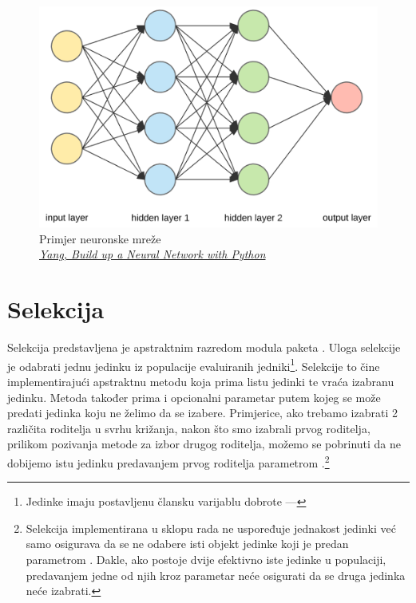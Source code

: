 \documentclass[times, utf8, zavrsni, numeric]{fer}
\begin{document}
\begin{figure}[h] 
    \centering
    \includegraphics[width=14cm]{img/nn}
    \caption{Primjer neuronske mreže\\ \textsl{\scriptsize
    \href{https://towardsdatascience.com/build-up-a-neural-network-with-python-7faea4561b31}{Yang,
    Build up a Neural Network with Python}}}\label{fig:nn}
\end{figure}


\section{Selekcija}

Selekcija  predstavljena je apstraktnim razredom
 modula  paketa . Uloga
selekcije je odabrati jednu jedinku iz populacije evaluiranih
jedniki\footnote{Jedinke imaju postavljenu člansku varijablu dobrote ---
}. Selekcije to čine implementirajući apstraktnu metodu
 koja prima listu jedinki te vraća izabranu jedinku. Metoda
također prima i opcionalni parametar  putem kojeg se može
predati jedinka koju ne želimo da se izabere. Primjerice, ako trebamo izabrati 2
različita roditelja u svrhu križanja, nakon što smo izabrali prvog roditelja,
prilikom pozivanja metode  za izbor drugog roditelja, možemo se
pobrinuti da ne dobijemo istu jedinku predavanjem prvog roditelja parametrom
.\footnote{Selekcija implementirana u sklopu rada
ne uspoređuje jednakost jedinki već samo osigurava da se ne odabere isti objekt
jedinke koji je predan parametrom . Dakle, ako postoje
dvije efektivno iste jedinke u populaciji, predavanjem jedne od njih kroz
parametar  neće osigurati da se druga jedinka neće
izabrati.}
\end{document}
